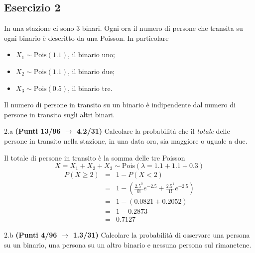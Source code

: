 \documentclass[
  11pt,
]{book}
\providecommand{\tightlist}{%
  \setlength{\itemsep}{0pt}\setlength{\parskip}{0pt}}
\theoremstyle{mytheoremstyle}
\theoremstyle{mydefstyle}
\newenvironment{sol}
  {
  \begin{tcolorbox}[enhanced,breakable,arc=0.1mm,boxrule=1pt,colback=white,colframe=iblue,
  title=\bf \fontfamily{lmss}\selectfont \hspace{.5 cm} Soluzione,drop fuzzy shadow]

}{
\end{tcolorbox}
  }
\begin{document}
\subsection{Esercizio 2}\label{esercizio-2-7}

In una stazione ci sono 3 binari. Ogni ora il numero di persone che transita su ogni
binario è descritto da una Poisson. In particolare

\begin{itemize}
\tightlist
\item
  \(X_1\sim\text{Pois}(1.1)\), il binario uno;
\item
  \(X_2\sim\text{Pois}(1.1)\), il binario due;
\item
  \(X_3\sim\text{Pois}(0.5)\), il binario tre.
\end{itemize}

Il numero di persone in transito su un binario è indipendente dal numero di persone in transito sugli altri binari.

2.a \textbf{(Punti 13/96 \(\rightarrow\) 4.2/31)} Calcolare la probabilità che il \emph{totale} delle persone in transito nella stazione, in una data ora, sia maggiore o uguale a due.

\begin{sol}
Il totale di persone in transito è la somma delle tre Poisson
\[
X=X_1+X_2+X_3\sim \text{Pois}(\lambda=1.1+1.1+0.3)
\]
\begin{eqnarray*}
   P( X \geq 2 ) &=& 1-P( X < 2 ) \\                 &=& 1-\left( \frac{ 2.5 ^{ 0 }}{ 0 !}e^{- 2.5 }+\frac{ 2.5 ^{ 1 }}{ 1 !}e^{- 2.5 } \right)\\                 &=& 1-( 0.0821+0.2052 )\\                 &=& 1- 0.2873 \\                 &=&   0.7127 
\end{eqnarray*}

\end{sol}

2.b \textbf{(Punti 4/96 \(\rightarrow\) 1.3/31)} Calcolare la probabilità di osservare una persona su un binario, una persona su un altro binario e nessuna persona sul rimanetene.
\end{document}
